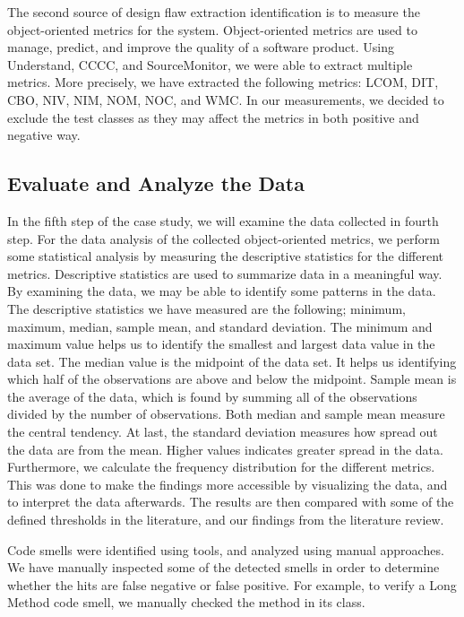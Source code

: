 The second source of design flaw extraction identification is to measure the object-oriented metrics for the system. Object-oriented metrics are used to manage, predict, and improve the quality of a software product\cite{rodriguez2001overview}. Using Understand, CCCC, and SourceMonitor, we were able to extract multiple metrics. More precisely, we have extracted the following metrics: LCOM, DIT, CBO, NIV, NIM, NOM, NOC, and WMC. In our measurements, we decided to exclude the test classes as they may affect the metrics in both positive and negative way.




\subsection{Evaluate and Analyze the Data}
In the fifth step of the case study, we will examine the data collected in fourth step. For the data analysis of the collected object-oriented metrics, we perform some statistical analysis by measuring the descriptive statistics for the different metrics. Descriptive statistics are used to summarize data in a meaningful way. By examining the data, we may be able to identify some patterns in the data. The descriptive statistics we have measured are the following; minimum, maximum, median, sample mean, and standard deviation. The minimum and maximum value helps us to identify the smallest and largest data value in the data set. The median value is the midpoint of the data set. It helps us identifying which half of the observations are above and below the midpoint. Sample mean is the average of the data, which is found by summing all of the observations divided by the number of observations. Both median and sample mean measure the central tendency. At last, the standard deviation measures how spread out the data are from the mean. Higher values indicates greater spread in the data. Furthermore, we calculate the frequency distribution for the different metrics. This was done to make the findings more accessible by visualizing the data, and to interpret the data afterwards. The results are then compared with some of the defined thresholds in the literature, and our findings from the literature review. 

Code smells were identified using tools, and analyzed using manual approaches. We have manually inspected some of the detected smells in order to determine whether the hits are false negative or false positive. For example, to verify a Long Method code smell, we manually checked the method in its class. 



